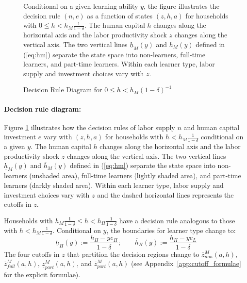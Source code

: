 \documentclass[12pt]{article}
\begin{document}
\begin{figure}
    \centering
    

\caption{Decision Rule Diagram for $0 \leq h<h_M(1-\delta)^{-1}$}
\begin{flushleft}
\footnotesize{Conditional on a given learning ability $y$, the figure illustrates the decision rule $(n,e)$ as a function of states $(z,h,a)$ for households with $0 \leq h<h_M\frac{1}{1-\delta}$. The human capital $h$ changes along the horizontal axis and the labor productivity shock $z$ changes along the vertical axis. The two vertical lines $\underline{h}_M(y)$ and $\overline{h}_M(y)$ defined in (\ref{eq:hm}) separate the state space into non-learners, full-time learners, and part-time learners. Within each learner type, labor supply and investment choices vary with $z$.} 
\end{flushleft}
    
\label{fig:rule-diagram}
\end{figure}


\paragraph{Decision rule diagram:} Figure \ref{fig:rule-diagram} illustrates how the decision rules of labor supply $n$ and human capital investment $e$ vary with $(z,h,a)$ for households with $h<h_M\frac{1}{1-\delta}$ conditional on a given $y$. The human capital $h$ changes along the horizontal axis and the labor productivity shock $z$ changes along the vertical axis. The two vertical lines $\underline{h}_M(y)$ and $\overline{h}_M(y)$ defined in (\ref{eq:hm}) separate the state space into non-learners (unshaded area), full-time learners (lightly shaded area), and part-time learners (darkly shaded area). Within each learner type, labor supply and investment choices vary with $z$ and the dashed horizontal lines represents the cutoffs in $z$.



\bigskip
\noindent
Households with $h_M\frac{1}{1-\delta} \leq h<h_H\frac{1}{1-\delta}$ have a decision rule analogous to those with $h<h_M\frac{1}{1-\delta}$. Conditional on $y$, the boundaries for learner type change to:
\begin{equation}\label{eq:hh}
    \underline{h}_H(y):=\frac{h_H-ye_H}{1-\delta}; \qquad \overline{h}_H(y):=\frac{h_H-ye_L}{1-\delta} 
\end{equation}
The four cutoffs in $z$ that partition the decision regions change to $\overline{z}^M_{non}(a,h)$, $\overline{z}^M_{full}(a,h)$, $\underline{z}^M_{part}(a,h)$, and $\overline{z}^M_{part}(a,h)$ (see Appendix~\ref{app:cutoff_formulae} for the explicit formulae).
\end{document}
